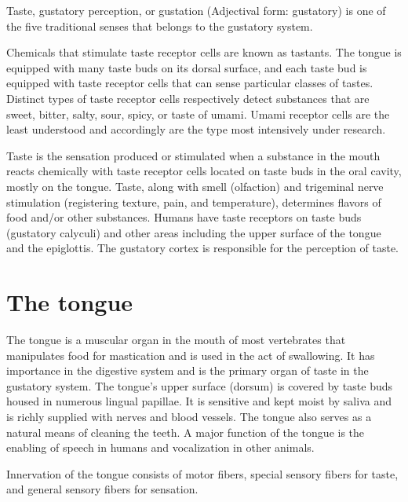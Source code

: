 \documentclass[]{book}
\begin{document}
Taste, gustatory perception, or gustation (Adjectival form: gustatory) is one of the five traditional senses that belongs to the gustatory system.

Chemicals that stimulate taste receptor cells are known as tastants. The tongue is equipped with many taste buds on its dorsal surface, and each taste bud is equipped with taste receptor cells that can sense particular classes of tastes. Distinct types of taste receptor cells respectively detect substances that are sweet, bitter, salty, sour, spicy, or taste of umami. Umami receptor cells are the least understood and accordingly are the type most intensively under research.

Taste is the sensation produced or stimulated when a substance in the mouth reacts chemically with taste receptor cells located on taste buds in the oral cavity, mostly on the tongue. Taste, along with smell (olfaction) and trigeminal nerve stimulation (registering texture, pain, and temperature), determines flavors of food and/or other substances. Humans have taste receptors on taste buds (gustatory calyculi) and other areas including the upper surface of the tongue and the epiglottis. The gustatory cortex is responsible for the perception of taste.

\hypertarget{the-tongue}{%
\section{The tongue}\label{the-tongue}}

The tongue is a muscular organ in the mouth of most vertebrates that manipulates food for mastication and is used in the act of swallowing. It has importance in the digestive system and is the primary organ of taste in the gustatory system. The tongue's upper surface (dorsum) is covered by taste buds housed in numerous lingual papillae. It is sensitive and kept moist by saliva and is richly supplied with nerves and blood vessels. The tongue also serves as a natural means of cleaning the teeth. A major function of the tongue is the enabling of speech in humans and vocalization in other animals.

Innervation of the tongue consists of motor fibers, special sensory fibers for taste, and general sensory fibers for sensation.
\end{document}
